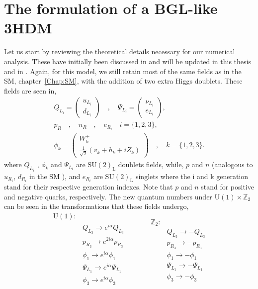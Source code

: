 \documentclass[10pt]{report}
\begin{document}
\section{The formulation of a BGL-like 3HDM} 
Let us start by reviewing the theoretical details necessary for our numerical analysis. These have initially been discussed in \cite{Ian_Thesis} and will be updated in this thesis and in \cite{Future}. Again, for this model, we still retain most of the same fields as in the SM, chapter~\ref{Chap:SM}, with the addition of two extra Higgs doublets. These fields are seen in, 
%
\begin{equation}
\label{eq:3HDM_Fields}
\begin{gathered}
Q_{L_i} =  \begin{pmatrix}
u_{L_i}  \\
d_{L_i}
\end{pmatrix} \quad , \quad \Psi_{L_i} =  \begin{pmatrix}
\nu_{L_i}  \\
e_{L_i}
\end{pmatrix}  ,  \\ 
p_R \quad , \quad n_R \quad , \quad e_{R_i} \quad i=\{1,2,3\}  ,  \\  
\phi_k = \begin{pmatrix}
  W_k^+ \\ 
\frac{1}{\sqrt{2}}\left( v_k + h_k + i Z_k \right) 
\end{pmatrix}  \quad , \quad k=\{ 1,2,3\}  . 
\end{gathered} 
\end{equation}
%
where $Q_{L_i}$ , $\phi_k$ and $\Psi_{L_i}$ are $\mathrm{SU(2)_L}$ doublets fields, while, $p$ and $n$ (analogous to $u_{R_i}$, $d_{R_i}$ in the SM ), and $e_{R_i}$ are $\mathrm{SU(2)_L}$ singlets where the i and k generation stand for their respective generation indexes. Note that $p$ and $n$ stand for positive and negative quarks, respectively. The new quantum numbers under $\mathrm{U(1)}\times\mathbb{Z}_2$ can be seen in the transformations that these fields undergo, 
%
\begin{equation}
\label{eq:3HDM_Transformations}
\begin{split} 
\mathrm{U(1)} : & \\
& Q_{L_3} \rightarrow    e^{i \alpha} Q_{L_3}  \\  
& p_{R_3} \rightarrow    e^{2 i \alpha} p_{R_3}  \\
& \phi_1  \rightarrow    e^{i \alpha} \phi_1  \\   
& \Psi_{L_1} \rightarrow e^{i \alpha} \Psi_{L_1} \\
& \phi_3 \rightarrow     e^{i \alpha} \phi_3  \\ 
\end{split} \quad \quad \quad  
\begin{split}
\mathbb{Z}_2 : & \\
& Q_{L_3} \rightarrow -Q_{L_3} \\
& p_{R_3} \rightarrow -p_{R_3} \\ 
& \phi_1  \rightarrow -\phi_1 \\ 
& \Psi_{L_1} \rightarrow - \Psi_{L_1} \\ 
& \phi_3 \rightarrow -\phi_3
\end{split}  
\end{equation} 
\end{document}
